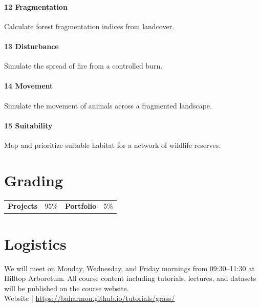 \documentclass[11pt,article,oneside]{memoir}
\begin{document}
\paragraph{12 Fragmentation} Calculate forest fragmentation indices from landcover.\dotfill

\paragraph{13 Disturbance} Simulate the spread of fire from a controlled burn.\dotfill

\paragraph{14 Movement} Simulate the movement of animals across a fragmented landscape.\dotfill

\paragraph{15 Suitability} Map and prioritize suitable habitat for a network of wildlife reserves.\dotfill


\section{Grading}

\begin{table}[H]
\begin{tabular}{ @{} l @{\hskip 1em} l @{\hskip 9em} l @{\hskip 1em} l }
\textbf{Projects} & 95\% & \textbf{Portfolio} & 5\% \\
\end{tabular}
\end{table}


\section{Logistics}

We will meet on Monday, Wednesday, and Friday mornings 
from 09:30--11:30 at Hilltop Arboretum. 
All course content including tutorials, lectures, and datasets
will be published on the course website.
\\

\noindent
Website | \url{https://baharmon.github.io/tutorials/grass/}
\end{document}

